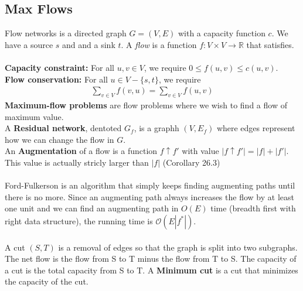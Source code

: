 \documentclass[a4paper]{article}
\author{Nikolaj Dybdahl Rathcke (rfq695)}
\begin{document}
\begin{center}
\section*{Max Flows}
\end{center}
Flow networks is a directed graph $G=(V,E)$ with a capacity function $c$. We have a source $s$ and and a sink $t$. A \textit{flow} is a function $f:V\times V\rightarrow \mathbb{R}$ that satisfies. \\
\\
\textbf{Capacity constraint:} For all $u,v\in V$, we require $0\leq f(u,v)\leq c(u,v)$. \\
\textbf{Flow conservation:} For all $u\in V-\{s,t\}$, we require
\begin{align*}
\sum_{v\in V} f(v,u)=\sum_{v\in V} f(u,v)
\end{align*}
\textbf{Maximum-flow problems} are flow problems where we wish to find a flow of maximum value.\\
A \textbf{Residual network}, dentoted $G_f$, is a graphh $(V, E_f)$ where edges represent how we can change the flow in $G$. \\
An \textbf{Augmentation} of a flow is a function $f\uparrow f'$ with value $|f\uparrow f'|=|f|+|f'|$. This value is actually stricly larger than $|f|$ (Corollary 26.3)\\
\\
Ford-Fulkerson is an algorithm that simply keeps finding augmenting paths until there is no more. Since an augmenting path always increases the flow by at least one unit and we can find an augmenting path in $O(E)$ time (breadth first with right data structure), the running time is $\mathcal{O}(E|f^*|)$. \\
\\
A cut $(S,T)$ is a removal of edges so that the graph is split into two subgraphs. The net flow is the flow from S to T minus the flow from T to S. The capacity of a cut is the total capacity from S to T. A \textbf{Minimum cut} is a cut that minimizes the capacity of the cut.
\end{document}

